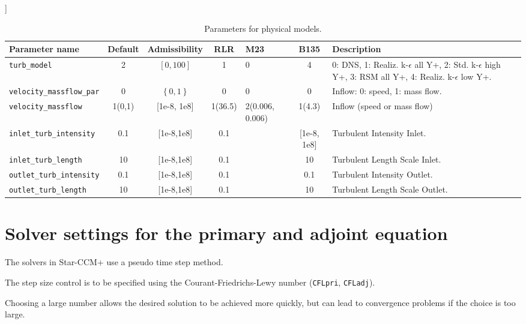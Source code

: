 \documentclass[a4paper,oneside]{book}
\numberwithin{equation}{section}
\begin{document}
\begin{table}[!htbp]]
    \begin{tabular}{|l|c|c|c|p{1cm}|c|p{5cm}|}
        \hline 
        \cellcolor{light-gray}\textbf{Parameter name} & \cellcolor{light-gray}\textbf{Default} & \cellcolor{light-gray}\textbf{Admissibility} & \cellcolor{light-gray}\textbf{RLR} & \cellcolor{light-gray}\textbf{M23} & \cellcolor{light-gray}\textbf{B135} & \cellcolor{light-gray}\textbf{Description} \\ 
        \hline 
        \verb|turb_model| & 2 & $\left[0,100\right]$ & 1 & 0 & 4 & 0: DNS, 1: Realiz. k-$\epsilon$ all Y+, 2: Std. k-$\epsilon$ high Y+, 3: RSM all Y+, 4: Realiz. k-$\epsilon$ low Y+. \\ 
        \hline 
        \verb|velocity_massflow_par| & 0 & $\left\{0,1\right\}$ & 0 & 0 & 0 & Inflow: 0: speed, 1: mass flow. \\ 
        \hline 
        \verb|velocity_massflow| & 1(0,1) & [1e-8, 1e8] & 1(36.5) & 2(0.006,
        0.006) & 1(4.3) & Inflow (speed
        or mass flow) \\ 
        \hline 
        \verb|inlet_turb_intensity| & 0.1 & [1e-8,1e8] & 0.1 &  & [1e-8, 1e8] & Turbulent Intensity Inlet. \\ 
        \hline 
        \verb|inlet_turb_length| & 10 & [1e-8,1e8] & 0.1 &  & 10 & Turbulent Length Scale Inlet. \\ 
        \hline 
        \verb|outlet_turb_intensity| & 0.1 & [1e-8,1e8] & 0.1 &  & 0.1 & Turbulent Intensity Outlet. \\ 
        \hline 
        \verb|outlet_turb_length| & 10 & [1e-8,1e8] & 0.1 &  & 10 & Turbulent Length Scale Outlet. \\ 
        \hline 
    \end{tabular}    
    \caption{Parameters for physical models.}
\end{table}

\section{Solver settings for the primary and adjoint equation}
The solvers in Star-CCM+ use a pseudo time step method.

The step size control is to be specified using the Courant-Friedrichs-Lewy number (\texttt{CFLpri}, \texttt{CFLadj}).

Choosing a large number allows the desired solution to be achieved more quickly, but can lead to convergence problems if the choice is too large.
\end{document}
